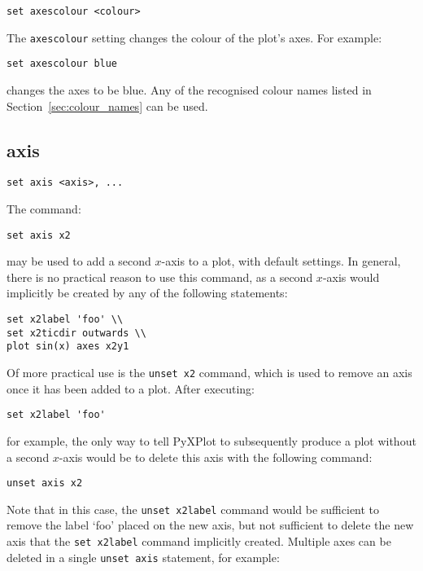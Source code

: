 \begin{verbatim}
set axescolour <colour>
\end{verbatim}

The {\tt axescolour} setting changes the colour of the plot's axes.  For example:

\begin{verbatim}
set axescolour blue
\end{verbatim}

\noindent changes the axes to be blue. Any of the recognised colour names listed in
Section~\ref{sec:colour_names} can be used.


\subsection{axis}

\begin{verbatim}
set axis <axis>, ...
\end{verbatim}

The command:

\begin{verbatim}
set axis x2
\end{verbatim}

\noindent may be used to add a second $x$-axis to a plot, with default settings. In
general, there is no practical reason to use this command, as a second $x$-axis
would implicitly be created by any of the following statements:

\begin{verbatim}
set x2label 'foo' \\
set x2ticdir outwards \\
plot sin(x) axes x2y1
\end{verbatim}

Of more practical use is the {\tt unset x2} command, which is used to remove an
axis once it has been added to a plot. After executing:

\begin{verbatim}
set x2label 'foo'
\end{verbatim}

\noindent for example, the only way to tell PyXPlot to subsequently produce a plot
without a second $x$-axis would be to delete this axis with the following
command:

\begin{verbatim}
unset axis x2
\end{verbatim}

Note that in this case, the {\tt unset x2label} command would be sufficient to
remove the label `foo' placed on the new axis, but not sufficient to delete the
new axis that the {\tt set x2label} command implicitly created. Multiple axes
can be deleted in a single {\tt unset axis} statement, for example:

